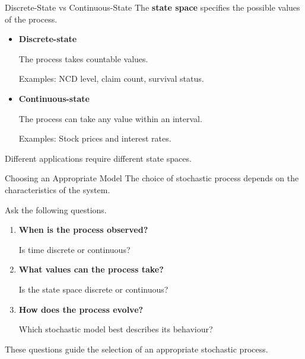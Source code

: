 \documentclass[
  ignorenonframetext,
  aspectratio=169,
]{beamer}
\begin{document}
\begin{frame}{Discrete-State vs Continuous-State}
\protect{}\label{discrete-state-vs-continuous-state}
The \textbf{state space} specifies the possible values of the process.

\begin{itemize}
\item
  \textbf{Discrete-state}

  The process takes countable values.

  Examples: NCD level, claim count, survival status.
\item
  \textbf{Continuous-state}

  The process can take any value within an interval.

  Examples: Stock prices and interest rates.
\end{itemize}

Different applications require different state spaces.
\end{frame}

\begin{frame}{Choosing an Appropriate Model}
\protect{}\label{choosing-an-appropriate-model}
The choice of stochastic process depends on the characteristics of the
system.

Ask the following questions.

\begin{enumerate}
\item
  \textbf{When is the process observed?}

  Is time discrete or continuous?
\item
  \textbf{What values can the process take?}

  Is the state space discrete or continuous?
\item
  \textbf{How does the process evolve?}

  Which stochastic model best describes its behaviour?
\end{enumerate}

These questions guide the selection of an appropriate stochastic
process.
\end{frame}
\end{document}
